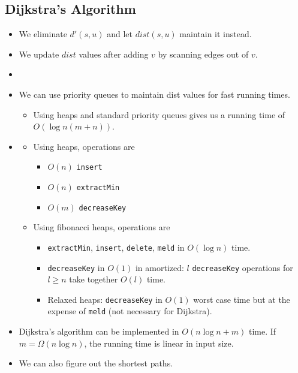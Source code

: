 \subsection{Dijkstra's Algorithm}
\begin{itemize}
    \item We eliminate $d'(s, u)$ and let $dist(s, u)$ maintain it instead.
    \item We update $dist$ values after adding $v$ by scanning edges out of $v$.
    \item[] 
    \item We can use priority queues to maintain dist values for fast running times.
    \begin{itemize}
        \item Using heaps and standard priority queues gives us a running time of $O(\log n(m + n))$.
    \end{itemize}
    \item[] 
    \begin{itemize}
        \item Using heaps, operations are
        \begin{itemize}
            \item $O(n)$ \texttt{insert}
            \item $O(n)$ \texttt{extractMin}
            \item $O(m)$ \texttt{decreaseKey}
        \end{itemize}
        \item Using fibonacci heaps, operations are
        \begin{itemize}
            \item \texttt{extractMin}, \texttt{insert}, \texttt{delete}, \texttt{meld} in $O(\log n)$ time.
            \item \texttt{decreaseKey} in $O(1)$ in amortized: $l$ \texttt{decreaseKey} operations for $l \geq n$ take together $O(l)$ time.
            \item Relaxed heaps: \texttt{decreaseKey} in $O(1)$ worst case time but at the expense of \texttt{meld} (not necessary for Dijkstra).
        \end{itemize}
    \end{itemize}
    \item Dijkstra's algorithm can be implemented in $O(n\log n + m)$ time. If $m = \Omega(n\log n)$, the running time is linear in input size.
    \item We can also figure out the shortest paths.

\end{itemize}

